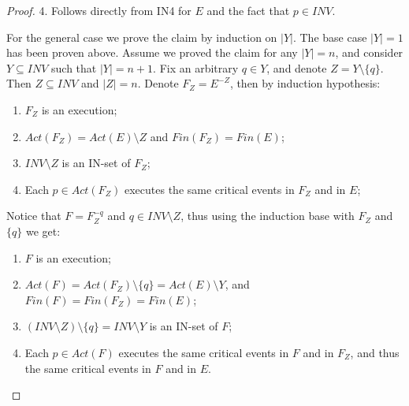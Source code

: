 \begin{proof}
	4. Follows directly from IN4 for $E$ and the fact that $p \in INV$.
	

	For the general case we prove the claim by induction on $|Y|$. The base case $|Y| = 1$ has been proven above. Assume we proved the claim for any $|Y|=n$, and consider $Y \subseteq INV$ such that $|Y| = n+1$. Fix an arbitrary $q \in Y$, and denote $Z = Y \setminus \{q\}$. Then $Z \subseteq INV$ and $|Z|=n$. Denote $F_Z = E^{-Z}$, then by induction hypothesis:
	\begin{enumerate}
		\item $F_Z$ is an execution;
		\item $Act(F_Z) = Act(E) \setminus Z$ and $Fin(F_Z) = Fin(E)$;
		\item $INV \setminus Z$ is an IN-set of $F_Z$;
		\item Each $p \in Act(F_Z)$ executes the same critical events in $F_Z$ and in $E$;
	\end{enumerate}
	Notice that $F = F_Z^{-q}$ and $q \in INV \setminus Z$, thus using the induction base with $F_Z$ and $\{q\}$ we get:
	\begin{enumerate}
		\item $F$ is an execution;
		\item $Act(F) = Act(F_Z) \setminus \{q\} = Act(E) \setminus Y$, and $Fin(F) = Fin(F_Z) = Fin(E)$;
		\item $(INV \setminus Z) \setminus \{q\} = INV \setminus Y$ is an IN-set of $F$;
		\item Each $p \in Act(F)$ executes the same critical events in $F$ and in $F_Z$, and thus the same critical events in $F$ and in $E$.
	\end{enumerate}
\end{proof}


